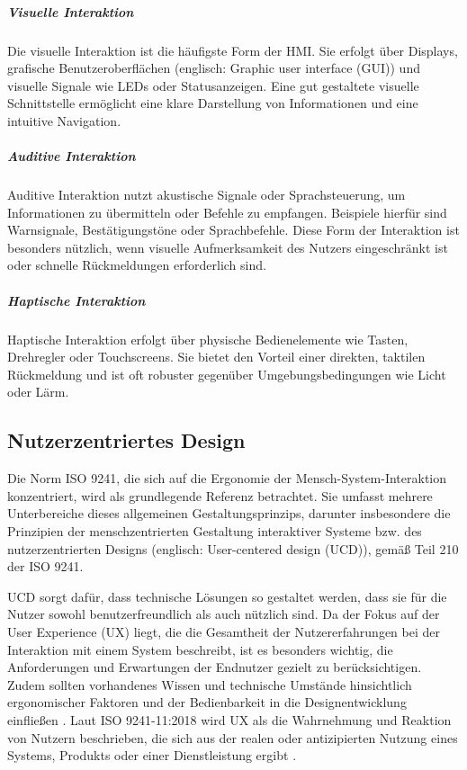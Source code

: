 \subparagraph{Visuelle Interaktion}
Die visuelle Interaktion ist die häufigste Form der HMI. Sie erfolgt über Displays, grafische Benutzeroberflächen (englisch: Graphic user interface (GUI)) und visuelle Signale wie LEDs oder Statusanzeigen. Eine gut gestaltete visuelle Schnittstelle ermöglicht eine klare Darstellung von Informationen und eine intuitive Navigation. \autocite{Nielsen.1994}

\subparagraph{Auditive Interaktion}
Auditive Interaktion nutzt akustische Signale oder Sprachsteuerung, um Informationen zu übermitteln oder Befehle zu empfangen. Beispiele hierfür sind Warnsignale, Bestätigungstöne oder Sprachbefehle. Diese Form der Interaktion ist besonders nützlich, wenn visuelle Aufmerksamkeit des Nutzers eingeschränkt ist oder schnelle Rückmeldungen erforderlich sind. \autocite{Dix.2004}

\subparagraph{Haptische Interaktion}
Haptische Interaktion erfolgt über physische Bedienelemente wie Tasten, Drehregler oder Touchscreens. Sie bietet den Vorteil einer direkten, taktilen Rückmeldung und ist oft robuster gegenüber Umgebungsbedingungen wie Licht oder Lärm. \autocite{Teather.2010}

\subsection{Nutzerzentriertes Design}
\label{cha:Nutzerzentriertes Design}

Die Norm ISO 9241, die sich auf die Ergonomie der Mensch-System-Interaktion konzentriert, wird als grundlegende Referenz betrachtet. Sie umfasst mehrere Unterbereiche
dieses allgemeinen Gestaltungsprinzips, darunter insbesondere die Prinzipien der menschzentrierten Gestaltung interaktiver Systeme bzw. des nutzerzentrierten Designs (englisch:
User-centered design (UCD)), gemäß Teil 210 der ISO 9241. \autocite{Francis.2025}

UCD sorgt dafür, dass technische Lösungen so gestaltet werden, dass sie für die Nutzer sowohl benutzerfreundlich als auch nützlich sind.
Da der Fokus auf der User Experience (UX) liegt,
die die Gesamtheit der Nutzererfahrungen bei der Interaktion mit einem System beschreibt, ist es besonders wichtig, die Anforderungen und Erwartungen
der Endnutzer gezielt zu berücksichtigen. Zudem sollten vorhandenes Wissen und
technische Umstände hinsichtlich ergonomischer Faktoren und der Bedienbarkeit in die Designentwicklung einfließen \autocite{Francis.2025}. Laut ISO 9241-11:2018 wird UX
als die Wahrnehmung und Reaktion von Nutzern beschrieben, die sich aus der realen oder
antizipierten Nutzung eines Systems, Produkts oder einer Dienstleistung ergibt \autocite{Guzman.2021}.

